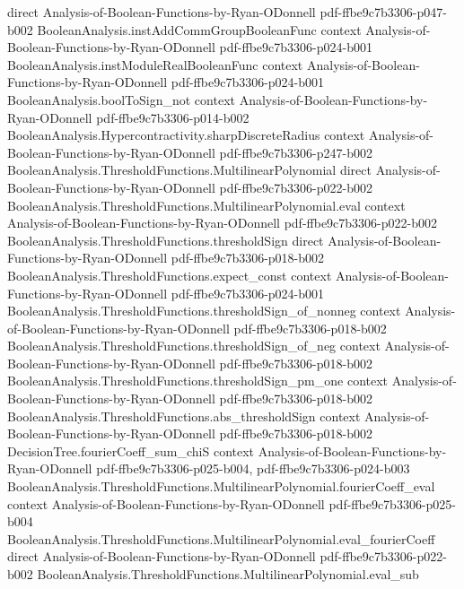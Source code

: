 \begin{theorem}
  {direct}
  {Analysis-of-Boolean-Functions-by-Ryan-ODonnell}
  {pdf-ffbe9c7b3306-p047-b002}
\proofstep
  {BooleanAnalysis.instAddCommGroupBooleanFunc}
  {context}
  {Analysis-of-Boolean-Functions-by-Ryan-ODonnell}
  {pdf-ffbe9c7b3306-p024-b001}
\proofstep
  {BooleanAnalysis.instModuleRealBooleanFunc}
  {context}
  {Analysis-of-Boolean-Functions-by-Ryan-ODonnell}
  {pdf-ffbe9c7b3306-p024-b001}
\proofstep
  {BooleanAnalysis.boolToSign_not}
  {context}
  {Analysis-of-Boolean-Functions-by-Ryan-ODonnell}
  {pdf-ffbe9c7b3306-p014-b002}
\proofstep
  {BooleanAnalysis.Hypercontractivity.sharpDiscreteRadius}
  {context}
  {Analysis-of-Boolean-Functions-by-Ryan-ODonnell}
  {pdf-ffbe9c7b3306-p247-b002}
\proofstep
  {BooleanAnalysis.ThresholdFunctions.MultilinearPolynomial}
  {direct}
  {Analysis-of-Boolean-Functions-by-Ryan-ODonnell}
  {pdf-ffbe9c7b3306-p022-b002}
\proofstep
  {BooleanAnalysis.ThresholdFunctions.MultilinearPolynomial.eval}
  {context}
  {Analysis-of-Boolean-Functions-by-Ryan-ODonnell}
  {pdf-ffbe9c7b3306-p022-b002}
\proofstep
  {BooleanAnalysis.ThresholdFunctions.thresholdSign}
  {direct}
  {Analysis-of-Boolean-Functions-by-Ryan-ODonnell}
  {pdf-ffbe9c7b3306-p018-b002}
\proofstep
  {BooleanAnalysis.ThresholdFunctions.expect_const}
  {context}
  {Analysis-of-Boolean-Functions-by-Ryan-ODonnell}
  {pdf-ffbe9c7b3306-p024-b001}
\proofstep
  {BooleanAnalysis.ThresholdFunctions.thresholdSign_of_nonneg}
  {context}
  {Analysis-of-Boolean-Functions-by-Ryan-ODonnell}
  {pdf-ffbe9c7b3306-p018-b002}
\proofstep
  {BooleanAnalysis.ThresholdFunctions.thresholdSign_of_neg}
  {context}
  {Analysis-of-Boolean-Functions-by-Ryan-ODonnell}
  {pdf-ffbe9c7b3306-p018-b002}
\proofstep
  {BooleanAnalysis.ThresholdFunctions.thresholdSign_pm_one}
  {context}
  {Analysis-of-Boolean-Functions-by-Ryan-ODonnell}
  {pdf-ffbe9c7b3306-p018-b002}
\proofstep
  {BooleanAnalysis.ThresholdFunctions.abs_thresholdSign}
  {context}
  {Analysis-of-Boolean-Functions-by-Ryan-ODonnell}
  {pdf-ffbe9c7b3306-p018-b002}
\proofstep
  {DecisionTree.fourierCoeff_sum_chiS}
  {context}
  {Analysis-of-Boolean-Functions-by-Ryan-ODonnell}
  {pdf-ffbe9c7b3306-p025-b004,
    pdf-ffbe9c7b3306-p024-b003}
\proofstep
  {BooleanAnalysis.ThresholdFunctions.MultilinearPolynomial.fourierCoeff_eval}
  {context}
  {Analysis-of-Boolean-Functions-by-Ryan-ODonnell}
  {pdf-ffbe9c7b3306-p025-b004}
\proofstep
  {BooleanAnalysis.ThresholdFunctions.MultilinearPolynomial.eval_fourierCoeff}
  {direct}
  {Analysis-of-Boolean-Functions-by-Ryan-ODonnell}
  {pdf-ffbe9c7b3306-p022-b002}
\proofstep
  {BooleanAnalysis.ThresholdFunctions.MultilinearPolynomial.eval_sub}

\end{theorem}
